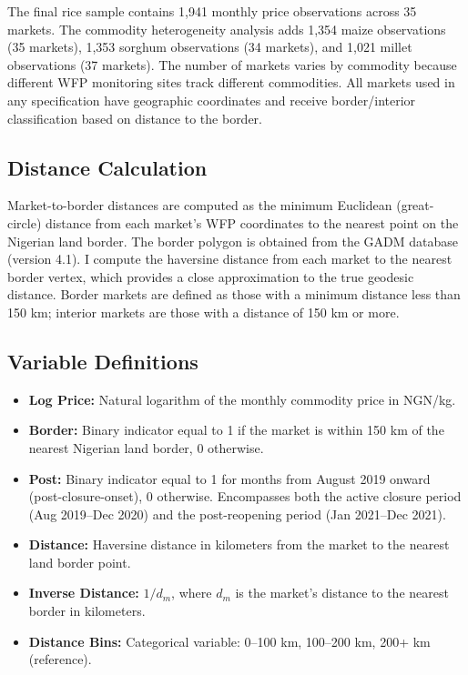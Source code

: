 \documentclass[12pt]{article}
\begin{document}
The final rice sample contains 1,941 monthly price observations across 35 markets. The commodity heterogeneity analysis adds 1,354 maize observations (35 markets), 1,353 sorghum observations (34 markets), and 1,021 millet observations (37 markets). The number of markets varies by commodity because different WFP monitoring sites track different commodities. All markets used in any specification have geographic coordinates and receive border/interior classification based on distance to the border.

\subsection{Distance Calculation}

Market-to-border distances are computed as the minimum Euclidean (great-circle) distance from each market's WFP coordinates to the nearest point on the Nigerian land border. The border polygon is obtained from the GADM database (version 4.1). I compute the haversine distance from each market to the nearest border vertex, which provides a close approximation to the true geodesic distance. Border markets are defined as those with a minimum distance less than 150 km; interior markets are those with a distance of 150 km or more.

\subsection{Variable Definitions}

\begin{itemize}
    \item \textbf{Log Price:} Natural logarithm of the monthly commodity price in NGN/kg.
    \item \textbf{Border:} Binary indicator equal to 1 if the market is within 150 km of the nearest Nigerian land border, 0 otherwise.
    \item \textbf{Post:} Binary indicator equal to 1 for months from August 2019 onward (post-closure-onset), 0 otherwise. Encompasses both the active closure period (Aug 2019--Dec 2020) and the post-reopening period (Jan 2021--Dec 2021).
    \item \textbf{Distance:} Haversine distance in kilometers from the market to the nearest land border point.
    \item \textbf{Inverse Distance:} $1 / d_m$, where $d_m$ is the market's distance to the nearest border in kilometers.
    \item \textbf{Distance Bins:} Categorical variable: 0--100 km, 100--200 km, 200+ km (reference).
\end{itemize}
\end{document}
